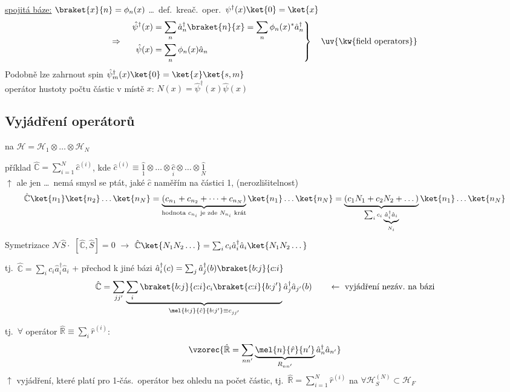 \underline{spojitá báze:} \quad $\braket{x}{n} = \phi_n(x)$ \quad \dots\ def.\ kreač.\ oper.\ $\psi^\dagger(x)\ket{0} = \ket{x}$
\[
  \Rightarrow\quad
  \left.\begin{aligned}
    \hat\psi^\dagger(x) &= \sum_n\hat a_n^\dagger\braket{n}{x} = \sum_n\phi_n(x)^*\hat a_n^\dagger \\
    \hat\psi(x) &= \sum_n\phi_n(x)\hat a_n
  \end{aligned}\right\}
  \quad\text{\uv{\kw{field operators}}}
\]
Podobně lze zahrnout spin \quad $\hat\psi_m^\dagger(x)\ket{0} = \ket{x}\ket{s,m}$ \\
operátor hustoty počtu částic v místě $x$: \quad $\hat N(x) = \hat\psi^\dagger(x)\hat\psi(x)$

\subsection*{Vyjádření operátorů}
 na $\mathcal{H} = \mathcal{H}_1\otimes\dots\otimes\mathcal{H}_N$

příklad \quad $\hat{\mathbb{C}} = \sum_{i=1}^{N}\hat c^{(i)}$, \quad kde $\hat c^{(i)} \equiv \underset{1}{\hat 1}\otimes\dots\otimes\underset{i}{\hat c}\otimes\dots\otimes\underset{N}{\hat 1}$ \\
\quad $\uparrow$ ale jen \dots\ nemá smysl se ptát, jaké $\hat c$ naměřím na částici 1, (nerozlišitelnost)
\[
  \hat{\mathbb{C}}\ket{n_1}\ket{n_2}\dots\ket{n_N} = \underbrace{(c_{n_1} + c_{n_2} + \dots + c_{n_N})}_{\text{hodnota } c_{n_i} \text{ je zde } N_{n_i} \text{ krát}}\ket{n_1}\dots\ket{n_N}
  = \underbrace{(c_1N_1 + c_2N_2 + \dots)}_{\sum_ic_i\underbrace{\scriptstyle\hat a_i^\dagger\hat a_i}_{N_i}}\ket{n_1}\dots\ket{n_N}
\]
Symetrizace $\mathcal{N}\hat S\cdot$ \quad $[\hat{\mathbb{C}},\hat S] = 0$ \quad $\to$ \quad
$\hat{\mathbb{C}}\ket{N_1N_2\dots} = \sum_ic_i\hat a_i^\dagger\hat a_i\ket{N_1N_2\dots}$

tj.\ \quad $\hat{\mathbb{C}} = \sum_ic_i\hat a_i^\dagger\hat a_i$ \quad + přechod k jiné bázi \quad
$\hat a_i^\dagger(c) = \sum_j\hat a_j^\dagger(b)\braket{b{:}j}{c{:}i}$
\[
  \hat{\mathbb{C}} = \sum_{jj'}\underbrace{\sum_i\braket{b{:}j}{c{:}i}c_i\braket{c{:}i}{b{:}j'}}_{\mel{b{:}j}{\hat c}{b{:}j'}\equiv c_{jj'}}\hat a_j^\dagger\hat a_{j'}(b)
  \qquad\leftarrow\ \text{vyjádření nezáv.\ na bázi}
\]

\begin{veta}
tj.\ $\forall$ operátor $\hat{\mathbb{R}} \equiv \sum_i\hat r^{(i)}$: \quad
\[
  \vzorec{\hat{\mathbb{R}} = \sum_{nn'}\underbrace{\mel{n}{\hat r}{n'}}_{R_{nn'}}\hat a_n^\dagger\hat a_{n'}}
\]
$\uparrow$ vyjádření, které platí pro 1-čás.\ operátor bez ohledu na počet částic, tj.\ $\hat{\mathbb{R}} = \sum_{i=1}^{N}\hat r^{(i)}$ na $\forall\mathcal{H}_S^{(N)}\subset\mathcal{H}_F$
\end{veta}

